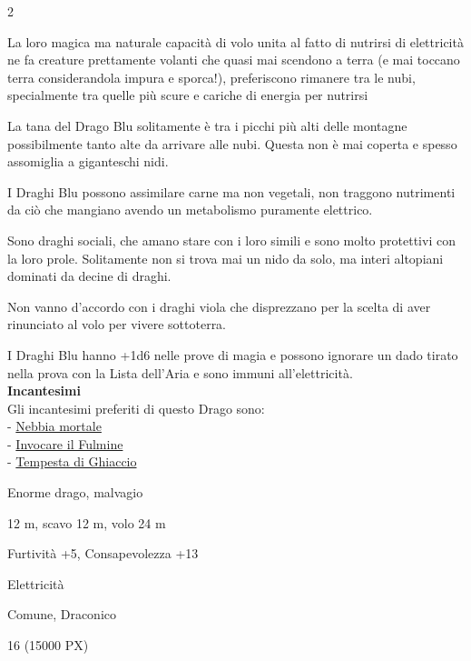 \begin{multicols}{2}
{La loro magica ma naturale capacità di volo unita al fatto di nutrirsi di elettricità ne fa creature prettamente volanti che quasi mai scendono a terra (e mai toccano terra considerandola impura e sporca!), preferiscono rimanere tra le nubi, specialmente tra quelle più scure e cariche di energia per nutrirsi

La tana del Drago Blu solitamente è tra i picchi più alti delle montagne possibilmente tanto alte da arrivare alle nubi. Questa non è mai coperta e spesso assomiglia a giganteschi nidi.

I Draghi Blu possono assimilare carne ma non vegetali, non traggono nutrimenti da ciò che mangiano avendo un metabolismo puramente elettrico.

Sono draghi sociali, che amano stare con i loro simili e sono molto protettivi con la loro prole.
Solitamente non si trova mai un nido da solo, ma interi altopiani dominati da decine di draghi.

Non vanno d'accordo con i draghi viola che disprezzano per la scelta di aver rinunciato al volo per vivere sottoterra.

I Draghi Blu hanno +1d6 nelle prove di magia e possono ignorare un dado tirato nella prova con la Lista dell'Aria e sono immuni all'elettricità.\\
\textbf{Incantesimi}\\
Gli incantesimi preferiti di questo Drago sono:\\
- \hyperlink{Nebbia mortale}{Nebbia mortale}\\
- \hyperlink{Invocare il Fulmine}{Invocare il Fulmine}\\
- \hyperlink{Tempesta di Ghiaccio}{Tempesta di Ghiaccio}

\begin{description}[noitemsep, topsep=0pt, parsep=0pt, partopsep=0pt, itemsep=1pt, leftmargin=2.35cm,  labelwidth=2.2cm, itemindent=0cm, listparindent=0pt] %
\setlength{\baselineskip}{10pt}
\item[\textbf{Taglia/Tipo}] Enorme drago, malvagio
\item[\textbf{Caratt.}] 
\item[\textbf{Punti Ferita}] 
\item[\textbf{Movimento}] 12 m, scavo 12 m, volo 24 m
\item[\textbf{Tiri Salvez.}] 
\item[\textbf{Comp.}] Furtività +5, Consapevolezza +13
\item[\textbf{Imm. Danni}] Elettricità
\item[\textbf{Sensi}] 
\item[\textbf{Linguaggi}] Comune, Draconico
\item[\textbf{Sfida}] 16 (15000 PX)
\end{description}
\smallskip

}
\end{multicols}
